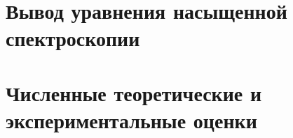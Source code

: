 


% 


\newpage
\section{Вывод уравнения насыщенной спектроскопии}





\newpage
\section{Численные теоретические и экспериментальные оценки}



% 


\newpage


